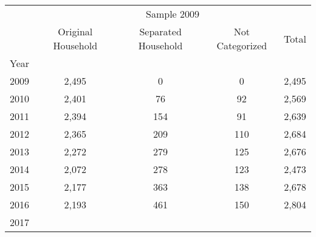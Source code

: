\documentclass{article}
\begin{document}
\begin{table}[!h]
\centering
\begin{tabular}{lllll}
\cline{1-5} \\
\multicolumn{1}{c}{} &
  \multicolumn{4}{|c}{Sample 2009} \\
\multicolumn{1}{c}{} &
  \multicolumn{1}{|c}{Original Household} &
  \multicolumn{1}{c}{Separated Household} &
  \multicolumn{1}{c}{Not Categorized} &
  \multicolumn{1}{c}{Total} \\
\cline{1-5} 
\multicolumn{1}{l}{Year} &
  \multicolumn{1}{|c}{} &
  \multicolumn{1}{c}{} &
  \multicolumn{1}{c}{} &
  \multicolumn{1}{c}{} \\
\multicolumn{1}{l}{\hspace{1em}2009} &
  \multicolumn{1}{|c}{2,495} &
  \multicolumn{1}{c}{0} &
  \multicolumn{1}{c}{0} &
  \multicolumn{1}{c}{2,495} \\
\multicolumn{1}{l}{\hspace{1em}2010} &
  \multicolumn{1}{|c}{2,401} &
  \multicolumn{1}{c}{76} &
  \multicolumn{1}{c}{92} &
  \multicolumn{1}{c}{2,569} \\
\multicolumn{1}{l}{\hspace{1em}2011} &
  \multicolumn{1}{|c}{2,394} &
  \multicolumn{1}{c}{154} &
  \multicolumn{1}{c}{91} &
  \multicolumn{1}{c}{2,639} \\
\multicolumn{1}{l}{\hspace{1em}2012} &
  \multicolumn{1}{|c}{2,365} &
  \multicolumn{1}{c}{209} &
  \multicolumn{1}{c}{110} &
  \multicolumn{1}{c}{2,684} \\
\multicolumn{1}{l}{\hspace{1em}2013} &
  \multicolumn{1}{|c}{2,272} &
  \multicolumn{1}{c}{279} &
  \multicolumn{1}{c}{125} &
  \multicolumn{1}{c}{2,676} \\
\multicolumn{1}{l}{\hspace{1em}2014} &
  \multicolumn{1}{|c}{2,072} &
  \multicolumn{1}{c}{278} &
  \multicolumn{1}{c}{123} &
  \multicolumn{1}{c}{2,473} \\
\multicolumn{1}{l}{\hspace{1em}2015} &
  \multicolumn{1}{|c}{2,177} &
  \multicolumn{1}{c}{363} &
  \multicolumn{1}{c}{138} &
  \multicolumn{1}{c}{2,678} \\
\multicolumn{1}{l}{\hspace{1em}2016} &
  \multicolumn{1}{|c}{2,193} &
  \multicolumn{1}{c}{461} &
  \multicolumn{1}{c}{150} &
  \multicolumn{1}{c}{2,804} \\
\multicolumn{1}{l}{\hspace{1em}2017} &

\end{tabular}
\end{table}
\end{document}

